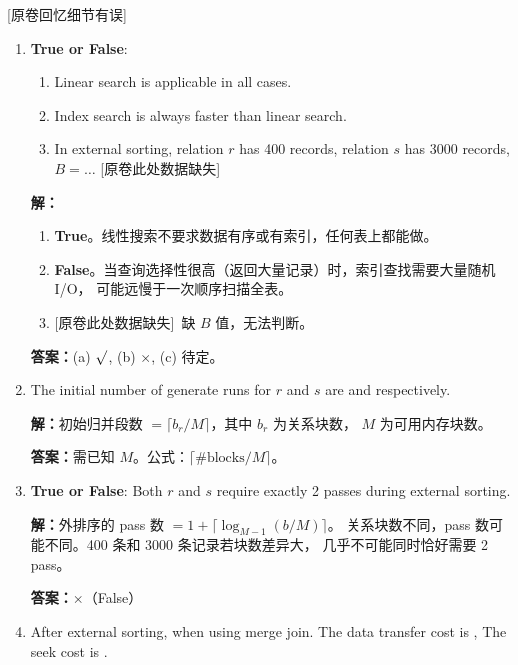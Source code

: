 \documentclass[11pt,a4paper]{article}
\newcommand{\solution}{\par\noindent\textcolor{ansblue}{\textbf{解：}}}
\newcommand{\answer}{\par\noindent\textcolor{ansred}{\textbf{答案：}}}
\newcommand{\missingnote}{\textcolor{ansred}{[原卷此处数据缺失]}}
\newcommand{\recallnote}{\textcolor{ansred}{[原卷回忆细节有误]}}
\begin{document}
\recallnote

\begin{enumerate}[leftmargin=*,itemsep=6pt]

\item \textbf{True or False}:

  \begin{enumerate}[label=(\alph*)]
    \item Linear search is applicable in all cases.
    \item Index search is always faster than linear search.
    \item In external sorting, relation $r$ has 400 records, relation $s$ has
          3000 records, $B = \dots$ \missingnote
  \end{enumerate}

  \solution
  \begin{enumerate}[label=(\alph*)]
    \item \textbf{True}。线性搜索不要求数据有序或有索引，任何表上都能做。
    \item \textbf{False}。当查询选择性很高（返回大量记录）时，索引查找需要大量随机 I/O，
          可能远慢于一次顺序扫描全表。
    \item \missingnote\ 缺 $B$ 值，无法判断。
  \end{enumerate}

  \answer (a) \textcolor{ansred}{$\surd$}, (b) \textcolor{ansred}{$\times$},
  (c) \textcolor{ansred}{待定}。

\item The initial number of generate runs for $r$ and $s$ are
  \underline{\hspace{1cm}} and \underline{\hspace{1cm}} respectively.

  \solution 初始归并段数 $= \lceil b_r / M \rceil$，其中 $b_r$ 为关系块数，
  $M$ 为可用内存块数。

  \answer 需已知 $M$。公式：$\lceil \text{\#blocks} / M \rceil$。

\item \textbf{True or False}: Both $r$ and $s$ require exactly 2 passes during
  external sorting.

  \solution 外排序的 pass 数 $= 1 + \lceil \log_{M-1}(b/M) \rceil$。
  关系块数不同，pass 数可能不同。400 条和 3000 条记录若块数差异大，
  几乎不可能同时恰好需要 2 pass。

  \answer \textcolor{ansred}{$\times$（False）}

\item After external sorting, when using merge join. The data transfer cost is
  \underline{\hspace{2cm}}, The seek cost is \underline{\hspace{2cm}}.


\end{enumerate}
\end{document}
